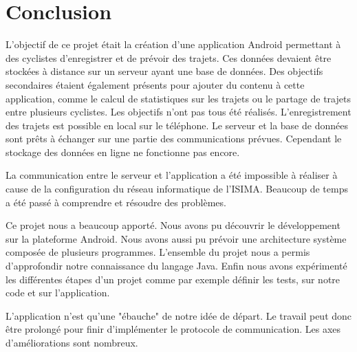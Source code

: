\documentclass[a4paper, 12pt]{report}
\begin{document}
\section{Conclusion}
L'objectif de ce projet était la création d'une application Android permettant à des cyclistes d'enregistrer et de prévoir des trajets. Ces données devaient être stockées à distance sur un serveur ayant une base de données. Des objectifs secondaires étaient également présents pour ajouter du contenu à cette application, comme le calcul de statistiques sur les trajets ou le partage de trajets entre plusieurs cyclistes.
Les objectifs n'ont pas tous été réalisés. L'enregistrement des trajets est possible en local sur le téléphone. Le serveur et la base de données sont prêts à échanger sur une partie des communications prévues. Cependant le stockage des données en ligne ne fonctionne pas encore.
\par
La communication entre le serveur et l'application a été impossible à réaliser à cause de la configuration du réseau informatique de l'ISIMA. Beaucoup de temps a été passé à comprendre et résoudre des problèmes.
\par
Ce projet nous a beaucoup apporté. Nous avons pu découvrir le développement sur la plateforme Android. Nous avons aussi pu prévoir une architecture système composée de plusieurs programmes. L'ensemble du projet nous a permis d'approfondir notre connaissance du langage Java. Enfin nous avons expérimenté les différentes étapes d'un projet comme par exemple définir les tests, sur notre code et sur l'application.
\par
L'application n'est qu'une "ébauche" de notre idée de départ. Le travail peut donc être prolongé pour finir d'implémenter le protocole de communication. Les axes d'améliorations sont nombreux.
\newpage

\newpage

\end{document}
